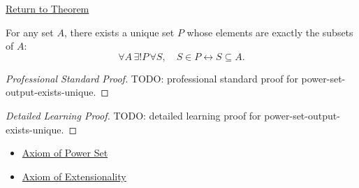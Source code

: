 \newpage
{}
\label{prf:power-set-output-exists-unique}

\begin{remark*}[Return]
\hyperref[thm:power-set-output-exists-unique]{Return to Theorem}
\end{remark*}

\begin{theorem*}
For any set $A$, there exists a unique set $P$ whose elements are exactly the
subsets of $A$:
\[
  \forall A\,\exists! P\,\forall S,\quad
  S\in P\leftrightarrow S\subseteq A.
\]
\end{theorem*}

\begin{proof}[Professional Standard Proof]
\LRAProofBodyStart
TODO: professional standard proof for power-set-output-exists-unique.
\end{proof}

\begin{proof}[Detailed Learning Proof]
\LRAProofBodyStart
TODO: detailed learning proof for power-set-output-exists-unique.
\end{proof}

\begin{remark*}
\end{remark*}

\begin{dependencies}
\begin{itemize}
  \item \hyperref[ax:power-set]{Axiom of Power Set}
  \item \hyperref[ax:extensionality]{Axiom of Extensionality}
\end{itemize}
\end{dependencies}

\clearpage
